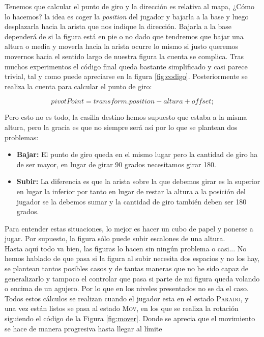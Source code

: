 \documentclass{article}
\begin{document}
Tenemos que calcular el punto de giro y la dirección es relativa al mapa, ¿Cómo lo hacemos? la idea es coger la \emph{position} del jugador y bajarla a la base y luego desplazarla hacia la arista que nos indique la dirección. Bajarla a la base dependerá de si la figura está en pie o no dado que tendremos que bajar una altura o media y moverla hacia la arista ocurre lo mismo si justo queremos movernos hacia el sentido largo de nuestra figura la cuenta se complica. Tras muchos experimentos el código final queda bastante simplificado y casi parece trivial, tal y como puede apreciarse en la figura \ref{fig:codigo}. Posteriormente se realiza la cuenta para calcular el punto de giro:

$$ pivotPoint = transform.position - altura + offset; $$

Pero esto no es todo, la casilla destino hemos supuesto que estaba a la misma altura, pero la gracia es que no siempre será así por lo que se plantean dos problemas:
\begin{itemize}
    \item \textbf{Bajar:} El punto de giro queda en el mismo lugar pero la cantidad de giro ha de ser mayor, en lugar de girar 90 grados necesitamos girar 180.
    \item \textbf{Subir:} La diferencia es que la arista sobre la que debemos girar es la superior en lugar la inferior por tanto en lugar de restar la altura a la posición del jugador se la debemos sumar y la cantidad de giro también deben ser 180 grados.
\end{itemize}
Para entender estas situaciones, lo mejor es hacer un cubo de papel y ponerse a jugar. Por supuesto, la figura sólo puede subir escalones de una altura. \\

Hasta aquí todo va bien, las figuras lo hacen sin ningún problema o casi... No hemos hablado de que pasa si la figura al subir necesita dos espacios y no los hay, se plantean tantos posibles casos y de tantas maneras que no he sido capaz de generalizarlo y tampoco el controlar que pasa si parte de mi figura queda volando o encima de un agujero. Por lo que en los niveles presentados no se da el caso. \\

Todos estos cálculos se realizan cuando el jugador esta en el estado \textsc{Parado}, y una vez están listos se pasa al estado \textsc{Mov}, en los que se realiza la rotación siguiendo el código de la Figura \ref{fig:mover}. Donde se aprecia que el movimiento se hace de manera progresiva hasta llegar al límite
\end{document}
